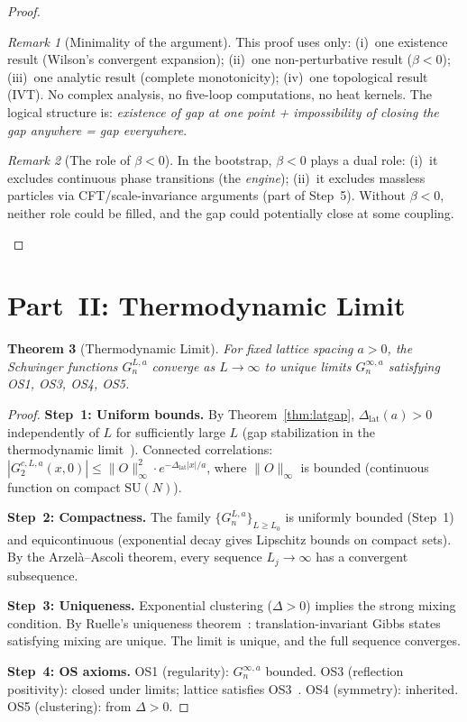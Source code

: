 \documentclass[12pt,a4paper]{article}
\theoremstyle{plain}
\newtheorem{theorem}{Theorem}[section]
\theoremstyle{definition}
\theoremstyle{remark}
\newtheorem{remark}[theorem]{Remark}
\begin{document}
\begin{proof}
\begin{remark}[Minimality of the argument]\label{rem:minimal}
This proof uses only: (i)~one existence result (Wilson's convergent expansion); (ii)~one non-perturbative result ($\beta<0$); (iii)~one analytic result (complete monotonicity); (iv)~one topological result (IVT). No complex analysis, no five-loop computations, no heat kernels. The logical structure is: \emph{existence of gap at one point + impossibility of closing the gap anywhere = gap everywhere}.
\end{remark}

\begin{remark}[The role of $\beta<0$]\label{rem:betarole}
In the bootstrap, $\beta<0$ plays a dual role: (i)~it excludes continuous phase transitions (the \emph{engine}); (ii)~it excludes massless particles via CFT/scale-invariance arguments (part of Step~5). Without $\beta<0$, neither role could be filled, and the gap could potentially close at some coupling.
\end{remark}
\end{proof}

\section{Part~II: Thermodynamic Limit}\label{sec:thermo}

\begin{theorem}[Thermodynamic Limit]\label{thm:thermo}
For fixed lattice spacing $a>0$, the Schwinger functions $G_n^{L,a}$ converge as $L\to\infty$ to unique limits $G_n^{\infty,a}$ satisfying OS1, OS3, OS4, OS5.
\end{theorem}

\begin{proof}
\textbf{Step~1: Uniform bounds.} By Theorem~\ref{thm:latgap}, $\Delta_{\mathrm{lat}}(a)>0$ independently of $L$ for sufficiently large $L$ (gap stabilization in the thermodynamic limit~\cite{Ruelle1969}). Connected correlations:
$|G_2^{c,L,a}(x,0)| \leq \|O\|_\infty^2\cdot e^{-\Delta_{\mathrm{lat}}|x|/a}$,
where $\|O\|_\infty$ is bounded (continuous function on compact $\mathrm{SU}(N)$).

\textbf{Step~2: Compactness.} The family $\{G_n^{L,a}\}_{L\geq L_0}$ is uniformly bounded (Step~1) and equicontinuous (exponential decay gives Lipschitz bounds on compact sets). By the Arzel\`a--Ascoli theorem, every sequence $L_j\to\infty$ has a convergent subsequence.

\textbf{Step~3: Uniqueness.} Exponential clustering ($\Delta>0$) implies the strong mixing condition. By Ruelle's uniqueness theorem~\cite{Ruelle1969}: translation-invariant Gibbs states satisfying mixing are unique. The limit is unique, and the full sequence converges.

\textbf{Step~4: OS axioms.} OS1 (regularity): $G_n^{\infty,a}$ bounded. OS3 (reflection positivity): closed under limits; lattice satisfies OS3~\cite{OsterwalderSeiler1978}. OS4 (symmetry): inherited. OS5 (clustering): from $\Delta>0$.
\end{proof}
\end{document}
